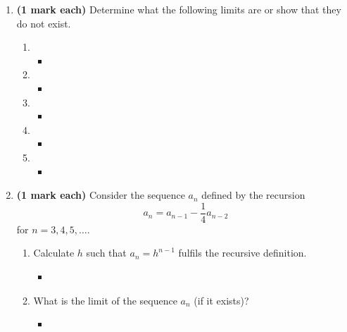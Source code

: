 \documentclass[12pt]{article}
\begin{document}
\begin{enumerate}[leftmargin=\labelsep]
\newpage

    \item {\bf (1 mark each)} Determine what the following limits are or show that they do not exist.
        \begin{enumerate}
            \item 
                \begin{itemize}[label={}]
                    \item 
                \end{itemize}
            \item 
                \begin{itemize}[label={}]
                    \item 
                \end{itemize}
            \item 
                \begin{itemize}[label={}]
                    \item 
                \end{itemize}
            \item 
                \begin{itemize}[label={}]
                    \item 
                \end{itemize}
            \item 
                \begin{itemize}[label={}]
                    \item 
                \end{itemize}
        \end{enumerate}

\newpage

    \item {\bf (1 mark each)} Consider the sequence $a_n$ defined by the recursion
        \begin{equation}
            a_n=a_{n-1}-\frac{1}{4}a_{n-2}
        \end{equation} for $n=3,4,5,\dots$.
        \begin{enumerate}
            \item Calculate $h$ such that $a_n=h^{n-1}$ fulfils the recursive definition.
                \begin{itemize}[label={}]
                    \item 
                \end{itemize}
            \item What is the limit of the sequence $a_n$ (if it exists)?
                \begin{itemize}[label={}]
                    \item 
                \end{itemize}
        \end{enumerate}


\end{enumerate}
\end{document}
